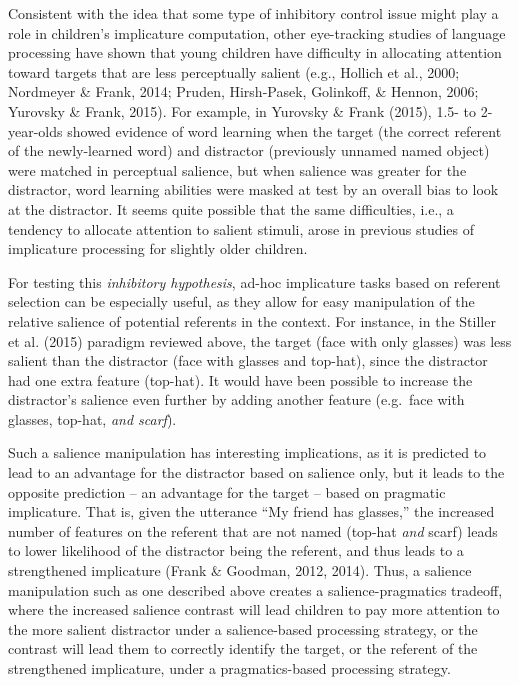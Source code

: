 \documentclass[a4paper,man,apacite,floatsintext]{apa6}
\begin{document}
Consistent with the idea that some type of inhibitory control issue
might play a role in children's implicature computation, other
eye-tracking studies of language processing have shown that young
children have difficulty in allocating attention toward targets that are
less perceptually salient (e.g., Hollich et al., 2000; Nordmeyer \&
Frank, 2014; Pruden, Hirsh-Pasek, Golinkoff, \& Hennon, 2006; Yurovsky
\& Frank, 2015). For example, in Yurovsky \& Frank (2015), 1.5- to
2-year-olds showed evidence of word learning when the target (the
correct referent of the newly-learned word) and distractor (previously
unnamed named object) were matched in perceptual salience, but when
salience was greater for the distractor, word learning abilities were
masked at test by an overall bias to look at the distractor. It seems
quite possible that the same difficulties, i.e., a tendency to allocate
attention to salient stimuli, arose in previous studies of implicature
processing for slightly older children.

For testing this \emph{inhibitory hypothesis}, ad-hoc implicature tasks
based on referent selection can be especially useful, as they allow for
easy manipulation of the relative salience of potential referents in the
context. For instance, in the Stiller et al. (2015) paradigm reviewed
above, the target (face with only glasses) was less salient than the
distractor (face with glasses and top-hat), since the distractor had one
extra feature (top-hat). It would have been possible to increase the
distractor's salience even further by adding another feature (e.g.~face
with glasses, top-hat, \emph{and scarf}).

Such a salience manipulation has interesting implications, as it is
predicted to lead to an advantage for the distractor based on salience
only, but it leads to the opposite prediction -- an advantage for the
target -- based on pragmatic implicature. That is, given the utterance
``My friend has glasses,'' the increased number of features on the
referent that are not named (top-hat \emph{and} scarf) leads to lower
likelihood of the distractor being the referent, and thus leads to a
strengthened implicature (Frank \& Goodman, 2012, 2014). Thus, a
salience manipulation such as one described above creates a
salience-pragmatics tradeoff, where the increased salience contrast will
lead children to pay more attention to the more salient distractor under
a salience-based processing strategy, or the contrast will lead them to
correctly identify the target, or the referent of the strengthened
implicature, under a pragmatics-based processing strategy.
\end{document}
